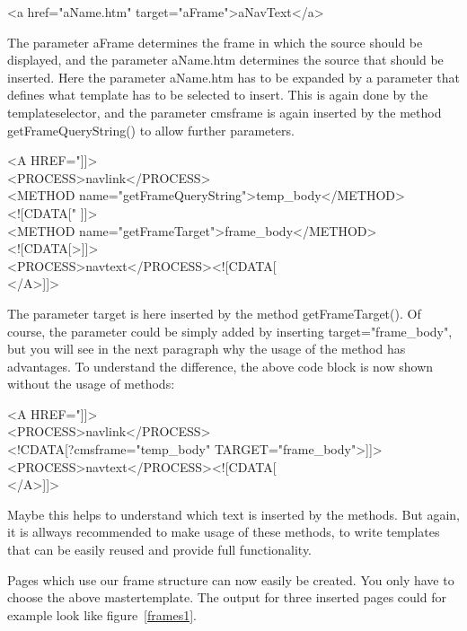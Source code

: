 {\tag <a href="aName.htm" target="aFrame">aNavText</a>}

The parameter {\name aFrame} determines the frame in which the source should be displayed,
and the parameter {\name aName.htm} determines the source that should be inserted.
Here the parameter {\name aName.htm} has to be expanded by a parameter that defines what template has
to be selected to insert. This is again done by the templateselector, and the parameter
{\name cmsframe} is again inserted by the method {\meth getFrameQueryString()} to allow further
parameters.

\begin{xml}
<A HREF="]]>\\
  <PROCESS>navlink</PROCESS>\\
    <METHOD name="getFrameQueryString">temp\_body</METHOD>\\
    <![CDATA[" ]]>\\
    <METHOD name="getFrameTarget">frame\_body</METHOD>\\
    <![CDATA[>]]>\\
  <PROCESS>navtext</PROCESS><![CDATA[\\
</A>]]>\\
\end{xml}


The parameter {\name target} is here inserted by the method {\meth getFrameTarget()}. 
Of course, the parameter could be simply added by inserting
{\tag target="frame\_body"}, but you will see in the next paragraph why the usage of the method
has advantages.
To understand the difference, the above code block is now shown without the usage of
methods:
\begin{xml}
<A HREF="]]>\\
  <PROCESS>navlink</PROCESS>\\
    <!CDATA[?cmsframe="temp\_body" TARGET="frame\_body">]]>\\
  <PROCESS>navtext</PROCESS><![CDATA[\\
</A>]]>\\
\end{xml}


Maybe this helps to understand which text is inserted by the methods. But again, it is allways
recommended to make usage of these methods, to write templates that can be easily reused and
provide full functionality.

Pages which use our frame structure can now easily be created. 
You only have to choose the above mastertemplate. 
The output for three inserted pages could for example look like
figure~\ref{frames1}.

